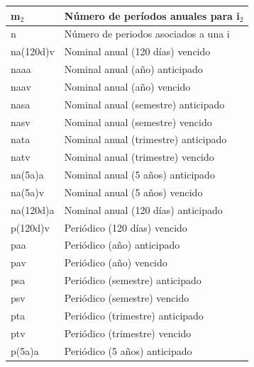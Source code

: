 \begin{spacing}{1}
\begin{center}
\begin{tabular}{ |p{2.5cm}|p{9.5cm}|}
m$_{2}$ & Número de períodos anuales para  i$_{2}$\\ \hline

n  & Número de periodos asociados a una i\\ \hline

na(120d)v & Nominal anual (120 días) vencido  \\ \hline

naaa & Nominal anual (año) anticipado\\ \hline  

naav & Nominal anual (año) vencido \\ \hline 

nasa & Nominal anual (semestre) anticipado\\\hline 

nasv & Nominal anual (semestre) vencido\\\hline  

nata & Nominal anual (trimestre) anticipado \\ \hline 

natv & Nominal anual (trimestre) vencido \\ \hline    

na(5a)a & Nominal anual (5 años) anticipado \\ \hline

na(5a)v & Nominal anual (5 años) vencido \\ \hline

na(120d)a & Nominal anual (120 días) anticipado  \\ \hline 

p(120d)v & Periódico (120 días) vencido\\ \hline

paa & Periódico (año)  anticipado \\ \hline

pav & Periódico (año) vencido  \\ \hline 

psa & Periódico (semestre) anticipado \\\hline 

psv & Periódico (semestre) vencido \\\hline

pta & Periódico (trimestre) anticipado \\ \hline 

ptv & Periódico (trimestre) vencido \\ \hline      

p(5a)a & Periódico (5 años) anticipado \\ \hline 


\end{tabular}
\end{center}
\end{spacing}
